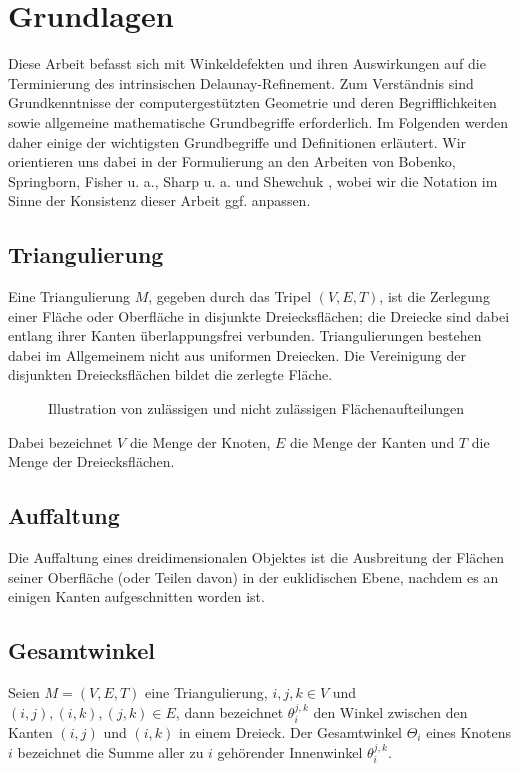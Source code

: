 \chapter{ Grundlagen}
Diese Arbeit befasst sich mit Winkeldefekten und ihren Auswirkungen auf die Terminierung des intrinsischen Delaunay-Refinement. Zum Verständnis sind Grundkenntnisse der computergestützten Geometrie und deren Begrifflichkeiten sowie allgemeine mathematische Grundbegriffe erforderlich. Im Folgenden werden daher einige der wichtigsten Grundbegriffe und Definitionen erläutert. Wir orientieren uns dabei in der
Formulierung an den Arbeiten von 
 Bobenko, Springborn, Fisher u. a., Sharp u. a. und Shewchuk
 \cite{Bobenko:2006:SIGGRAPH,Sharp:2019:NIT,Bobenko:2007:LaplaceBeltrami,shewchuk:1997:delaunay,SHEWCHUK:2002:chuws},
wobei wir die Notation im Sinne der Konsistenz dieser Arbeit ggf. anpassen.

\section*{Triangulierung}

Eine Triangulierung $M$, gegeben durch das Tripel $  (V, E, T) $, ist die Zerlegung einer Fläche oder Oberfläche in disjunkte Dreiecksflächen; die Dreiecke sind dabei entlang ihrer Kanten überlappungsfrei verbunden.
Triangulierungen bestehen dabei im Allgemeinem nicht aus uniformen Dreiecken.
Die Vereinigung der disjunkten Dreiecksflächen bildet die zerlegte Fläche. \\  

\begin{figure}[h]%
    \centering
  
  \caption{Illustration von zulässigen und nicht zulässigen Flächenaufteilungen}
\end{figure}

Dabei bezeichnet  $V$ die Menge der Knoten, $E$ die Menge der Kanten und $T$ die Menge der Dreiecksflächen.


\section*{Auffaltung}
Die Auffaltung eines dreidimensionalen Objektes ist die Ausbreitung der Flächen seiner Oberfläche (oder Teilen davon) in der euklidischen Ebene, nachdem es an einigen Kanten aufgeschnitten worden ist. 

\section*{Gesamtwinkel}
\label{def:gesamtwinkel}
Seien $M = (V, E, T)$ eine Triangulierung, $i,j,k \in V$ und $(i, j),(i, k),(j, k) \in E$, dann bezeichnet $\theta_i^{j,k}$ den Winkel zwischen den Kanten  $(i, j)$ und $(i, k)$ in einem Dreieck. Der Gesamtwinkel $ \Theta_i$ eines Knotens $i$ bezeichnet die Summe aller zu $i$ gehörender Innenwinkel $\theta_i^{j,k}$.

